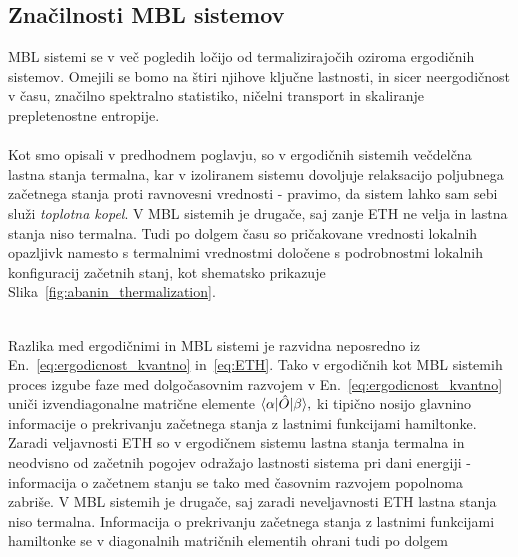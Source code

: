 \subsection{Značilnosti MBL sistemov } 
MBL sistemi se v več pogledih ločijo od termalizirajočih oziroma ergodičnih sistemov. Omejili se bomo na štiri njihove ključne lastnosti, in sicer neergodičnost v času, značilno spektralno statistiko, ničelni transport in skaliranje prepletenostne entropije. \\\\
Kot smo opisali v predhodnem poglavju, so v ergodičnih sistemih večdelčna lastna stanja termalna, kar v izoliranem sistemu dovoljuje relaksacijo poljubnega začetnega stanja proti ravnovesni vrednosti - pravimo, da sistem lahko sam sebi služi \emph{toplotna kopel}. V MBL sistemih je drugače, saj zanje ETH ne velja in lastna stanja niso termalna. Tudi po dolgem času so pričakovane vrednosti lokalnih opazljivk namesto s termalnimi vrednostmi določene s podrobnostmi lokalnih konfiguracij začetnih stanj, kot shematsko prikazuje Slika~\ref{fig:abanin_thermalization}.\\\\
\begin{minipage}[t]{0.44\textwidth}
\noindent 
Razlika med ergodičnimi in MBL sistemi je razvidna neposredno iz En.~\eqref{eq:ergodicnost_kvantno} in~\eqref{eq:ETH}. Tako v ergodičnih kot MBL sistemih proces izgube faze med dolgočasovnim razvojem v En.~\eqref{eq:ergodicnost_kvantno} uniči izvendiagonalne matrične elemente $\langle \alpha \vert\hat{O}\vert\beta\rangle,$ ki tipično nosijo glavnino informacije o prekrivanju začetnega stanja z lastnimi funkcijami hamiltonke. Zaradi veljavnosti ETH so v ergodičnem sistemu lastna stanja termalna in neodvisno od začetnih pogojev odražajo lastnosti sistema pri dani energiji - informacija o začetnem stanju se tako med časovnim razvojem popolnoma zabriše. V MBL sistemih je drugače, saj zaradi neveljavnosti ETH lastna stanja niso termalna. Informacija o prekrivanju začetnega stanja z lastnimi funkcijami hamiltonke se v diagonalnih matričnih elementih ohrani tudi po dolgem
\end{minipage}\hfill
